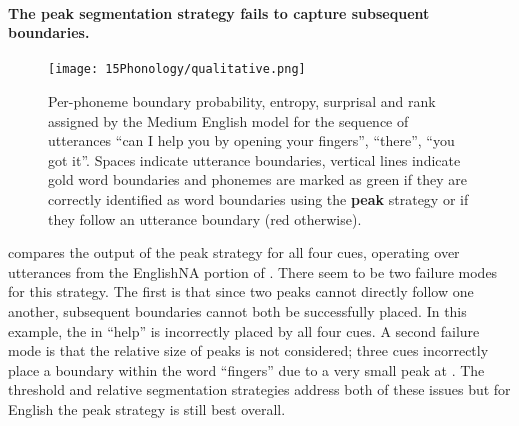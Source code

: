 \paragraph{The peak segmentation strategy fails to capture subsequent boundaries.}

\begin{figure}[t]
    \centering
    \texttt{[image: 15Phonology/qualitative.png]}
    \caption{Per-phoneme boundary probability, entropy, surprisal and rank assigned by the Medium English model for the sequence of utterances ``can I help you by opening your fingers'', ``there'', ``you got it''. Spaces indicate utterance boundaries, vertical lines indicate gold word boundaries and phonemes are marked as green if they are correctly identified as word boundaries using the \textbf{peak} strategy or if they follow an utterance boundary (red otherwise).}
    \label{fig:15-qualitative}
\end{figure}

 compares the output of the peak strategy for all four cues, operating over utterances from the EnglishNA portion of \ipachildes. There seem to be two failure modes for this strategy. The first is that since two peaks cannot directly follow one another, subsequent boundaries cannot both be successfully placed. In this example, the  in ``help'' is incorrectly placed by all four cues. A second failure mode is that the relative size of peaks is not considered; three cues incorrectly place a boundary within the word ``fingers'' due to a very small peak at \textipa{\textschwa}. The threshold and relative segmentation strategies address both of these issues but for English the peak strategy is still best overall.




